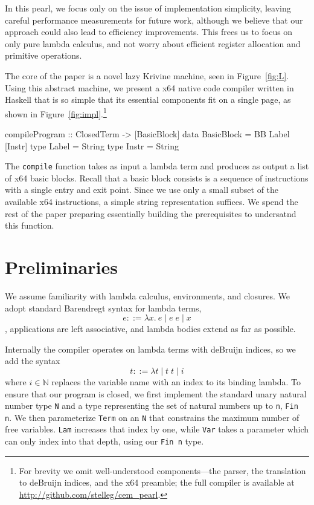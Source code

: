 \documentclass[preprint]{sigplanconf}
\begin{document}
In this pearl, we focus only on the issue of implementation simplicity, leaving
careful performance measurements for future work, although we believe that our
approach could also lead to efficiency improvements. This frees us to focus on
only pure lambda calculus, and not worry about efficient register allocation and
primitive operations. 

The core of the paper is a novel lazy Krivine machine, seen in
Figure~\ref{fig:L}. Using this abstract machine, we present a x64 native code
compiler written in Haskell that is so simple that its essential components fit
on a single page, as shown in Figure~\ref{fig:impl}.\footnote{For brevity we
omit well-understood components---the parser, the translation to deBruijn
indices, and the x64 preamble; the full compiler is available at
\url{http://github.com/stelleg/cem_pearl}.} 

\begin{code}
compileProgram :: ClosedTerm -> [BasicBlock]
data BasicBlock = BB Label [Instr]
type Label = String
type Instr = String
\end{code}

The \texttt{compile} function takes as input a lambda term and produces as
output a list of x64 basic blocks. Recall that a basic block consists is a
sequence of instructions with a single entry and exit point. Since we use only a
small subset of the available x64 instructions, a simple string representation
suffices. We spend the rest of the paper preparing essentially building the
prerequisites to undersatnd this function.

\section{Preliminaries}
We assume familiarity with lambda calculus, environments, and closures.
We adopt standard Barendregt syntax \cite{barendregt1984lambda} for lambda
terms, $$ e ::=  \lambda x.\ e \; | \; e \;  e \; | \; x $$, applications are
left associative, and lambda bodies extend as far as possible. 

Internally the compiler operates on lambda terms with deBruijn indices, so we
add the syntax $$ t ::= \lambda t \; | \; t \; t \; | \; i $$ where $i \in
\mathbb{N}$ replaces the variable name with an index to its binding lambda. To
ensure that our program is closed, we first implement the standard unary natural
number type \texttt{N} and a type representing the set of natural numbers up to
\texttt{n}, \texttt{Fin n}. We then parameterize \texttt{Term} on an \texttt{N}
that constrains the maximum number of free variables. \texttt{Lam} increases
that index by one, while \texttt{Var} takes a parameter which can only index
into that depth, using our \texttt{Fin n} type.
\end{document}
